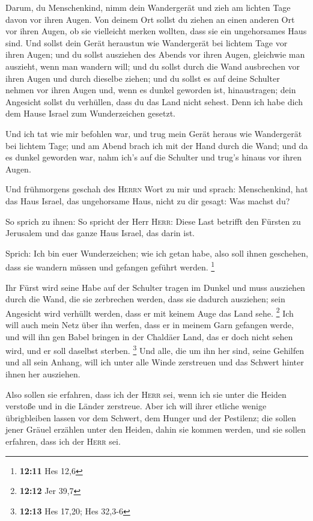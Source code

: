  Darum, du Menschenkind, nimm dein Wandergerät und zieh am
lichten Tage davon vor ihren Augen. Von deinem Ort sollst du ziehen an
einen anderen Ort vor ihren Augen, ob sie vielleicht merken wollten,
dass sie ein ungehorsames Haus sind.  Und sollst dein
Gerät heraustun wie Wandergerät bei lichtem Tage vor ihren Augen; und du
sollst ausziehen des Abends vor ihren Augen, gleichwie man auszieht,
wenn man wandern will;  und du sollst durch die Wand
ausbrechen vor ihren Augen und durch dieselbe ziehen;  und
du sollst es auf deine Schulter nehmen vor ihren Augen und, wenn es
dunkel geworden ist, hinaustragen; dein Angesicht sollst du verhüllen,
dass du das Land nicht sehest. Denn ich habe dich dem Hause Israel zum
Wunderzeichen gesetzt.

 Und ich tat wie mir befohlen war, und trug mein Gerät
heraus wie Wandergerät bei lichtem Tage; und am Abend brach ich mit der
Hand durch die Wand; und da es dunkel geworden war, nahm ich's auf die
Schulter und trug's hinaus vor ihren Augen.

 Und frühmorgens geschah des \textsc{Herrn} Wort zu mir
und sprach:  Menschenkind, hat das Haus Israel, das
ungehorsame Haus, nicht zu dir gesagt: Was machst du?

 So sprich zu ihnen: So spricht der Herr \textsc{Herr}:
Diese Last betrifft den Fürsten zu Jerusalem und das ganze Haus Israel,
das darin ist.

 Sprich: Ich bin euer Wunderzeichen; wie ich getan habe,
also soll ihnen geschehen, dass sie wandern müssen und gefangen geführt
werden. \footnote{\textbf{12:11} Hes 12,6}

 Ihr Fürst wird seine Habe auf der Schulter tragen im
Dunkel und muss ausziehen durch die Wand, die sie zerbrechen werden,
dass sie dadurch ausziehen; sein Angesicht wird verhüllt werden, dass er
mit keinem Auge das Land sehe. \footnote{\textbf{12:12} Jer 39,7}
 Ich will auch mein Netz über ihn werfen, dass er in
meinem Garn gefangen werde, und will ihn gen Babel bringen in der
Chaldäer Land, das er doch nicht sehen wird, und er soll daselbst
sterben. \footnote{\textbf{12:13} Hes 17,20; Hes 32,3-6} 
Und alle, die um ihn her sind, seine Gehilfen und all sein Anhang, will
ich unter alle Winde zerstreuen und das Schwert hinter ihnen her
ausziehen.

 Also sollen sie erfahren, dass ich der \textsc{Herr}
sei, wenn ich sie unter die Heiden verstoße und in die Länder zerstreue.
 Aber ich will ihrer etliche wenige übrigbleiben lassen
vor dem Schwert, dem Hunger und der Pestilenz; die sollen jener Gräuel
erzählen unter den Heiden, dahin sie kommen werden, und sie sollen
erfahren, dass ich der \textsc{Herr} sei.


